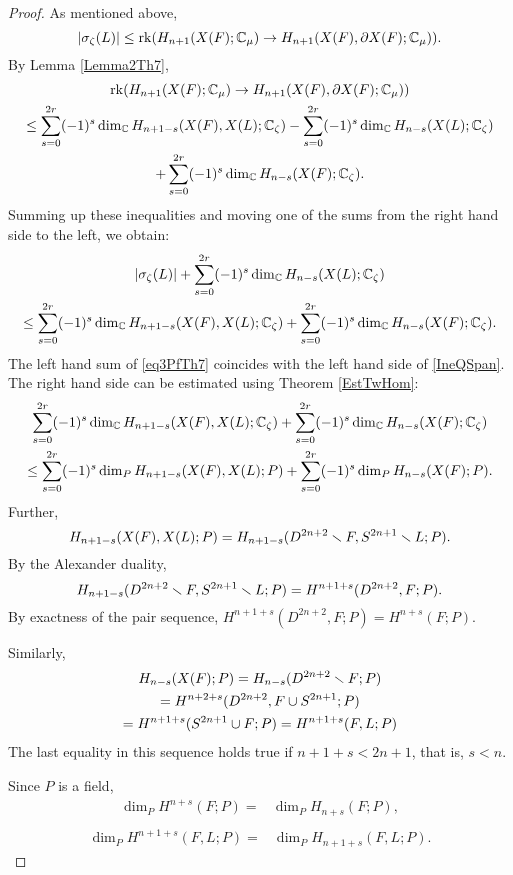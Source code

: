 \documentclass{article}
\numberwithin{equation}{section}
\begin{document}
\begin{proof}As mentioned above, 
\begin{equation}\label{eq1PfTh7}
|\sigma_\zeta(L)|\le \operatorname{rk}(H_{n+1}(X(F);\mathbb C_\mu)\to H_{n+1}(X(F),\partial X(F);\mathbb C_\mu)).
\end{equation}
By Lemma \ref{Lemma2Th7}, 
\begin{multline}\label{eq2PfTh7}
\operatorname{rk}(H_{n+1}(X(F);\mathbb C_\mu)\to H_{n+1}(X(F),\partial X(F);\mathbb C_\mu))\\
\le \sum_{s=0}^{2r}(-1)^s\dim_\mathbb C H_{n+1-s}(X(F),X(L);\mathbb C_\zeta)
-\sum_{s=0}^{2r}(-1)^s\dim_\mathbb C H_{n-s}(X(L);\mathbb C_\zeta)\\
+\sum_{s=0}^{2r}(-1)^s\dim_\mathbb C H_{n-s}(X(F);\mathbb C_\zeta).
\end{multline}
Summing up these inequalities and moving one of the sums from the right
hand side to the left, we obtain:
\begin{multline}\label{eq3PfTh7}
|\sigma_\zeta(L)|+\sum_{s=0}^{2r}(-1)^s\dim_\mathbb C H_{n-s}(X(L);\mathbb C_\zeta)\\
\le \sum_{s=0}^{2r}(-1)^s\dim_\mathbb C H_{n+1-s}(X(F),X(L);\mathbb C_\zeta)
+\sum_{s=0}^{2r}(-1)^s\dim_\mathbb C H_{n-s}(X(F);\mathbb C_\zeta).
\end{multline}
The left hand sum of \eqref{eq3PfTh7} coincides with the left hand side
of \eqref{IneQSpan}. The right hand side can be estimated using 
Theorem \ref{EstTwHom}:
\begin{multline}\label{eq4PfTh7}
\sum_{s=0}^{2r}(-1)^s\dim_\mathbb C H_{n+1-s}(X(F),X(L);\mathbb C_\zeta)
+\sum_{s=0}^{2r}(-1)^s\dim_\mathbb C H_{n-s}(X(F);\mathbb C_\zeta)\\
\le\sum_{s=0}^{2r}(-1)^s\dim_P H_{n+1-s}(X(F),X(L);P)
+\sum_{s=0}^{2r}(-1)^s\dim_P H_{n-s}(X(F);P).
\end{multline}
Further, 
$$H_{n+1-s}(X(F),X(L);P)=H_{n+1-s}(D^{2n+2}\smallsetminus F,S^{2n+1}\smallsetminus L;P).
$$
By the Alexander duality,
$$ H_{n+1-s}(D^{2n+2}\smallsetminus F,S^{2n+1}\smallsetminus L;P)
  =
H^{n+1+s}(D^{2n+2},F;P).
$$
By exactness of the pair sequence, $H^{n+1+s}(D^{2n+2},F;P)=H^{n+s}(F;P)$.

Similarly,
\begin{multline*}
H_{n-s}(X(F);P)=H_{n-s}(D^{2n+2}\smallsetminus F;P)\\
=H^{n+2+s}(D^{2n+2},F\cup S^{2n+1};P)\\
=H^{n+1+s}(S^{2n+1}\cup F;P)=H^{n+1+s}(F,L;P)
\end{multline*}
The last equality in this sequence holds true if $n+1+s<2n+1$, that is,
$s<n$. 

Since $P$ is a field, 
\begin{align}
\dim_P H^{n+s}(F;P)=&\dim_P H_{n+s}(F;P),\label{eq5PfTh7} \\
\end{align}
\begin{align} 
\dim_P H^{n+1+s}(F,L;P)=&\dim_P H_{n+1+s}(F,L;P)\label{eq6PfTh7}.
\end{align}


\end{proof}
\end{document}
